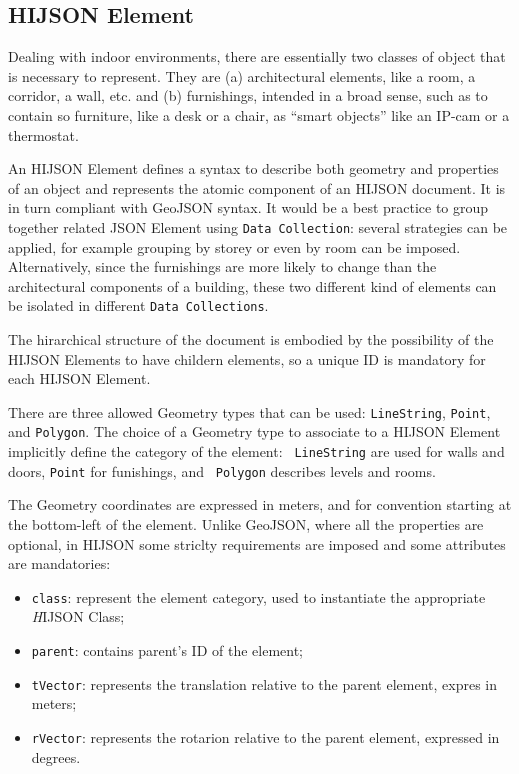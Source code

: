 \subsection{HIJSON Element}

Dealing with indoor environments, there are essentially two classes of object
that is necessary to represent. They are (a) architectural elements, like a
room, a corridor, a wall, etc. and (b) furnishings, intended in a broad sense,
such as to contain so furniture, like a desk or a chair, as ``smart objects''
like an IP-cam or a thermostat.

An HIJSON Element defines a syntax to describe both geometry and properties of
an object and represents the atomic component of an HIJSON document. It is in
turn compliant with GeoJSON syntax. It would be a best practice to group
together related JSON Element using {\tt Data Collection}: several strategies
can be applied, for example grouping by storey or even by room can be imposed.
Alternatively, since the furnishings are more likely to change than the
architectural components of a building, these two different kind of elements
can be isolated in different {\tt Data Collections}.


The hirarchical structure of the document is embodied by the possibility of the HIJSON Elements to have childern elements, so a unique ID is mandatory for each HIJSON Element. 

There are three allowed Geometry types that can be used: {\tt LineString},
{\tt Point}, and {\tt Polygon}. The choice of a Geometry type to associate to
a HIJSON Element implicitly define the category of the element: {\tt
LineString} are used for walls and doors, {\tt Point} for funishings, and {\tt
Polygon} describes levels and rooms.

The Geometry coordinates are expressed in meters, and for convention starting
at the bottom-left of the element. Unlike GeoJSON, where all the properties
are optional, in HIJSON some striclty requirements are imposed and some
attributes are mandatories:

\begin{itemize}
\itemsep1pt\parskip0pt
\item
 {\tt class}: represent the element category, used to instantiate
 the appropriate {\emph HIJSON Class};
\item
 {\tt parent}: contains parent's ID of the element;
\item
 {\tt tVector}: represents the translation relative to 
 the parent element, expres in meters;
\item
 {\tt rVector}: represents the rotarion relative to 
 the parent element, expressed in  degrees.
\end{itemize}

